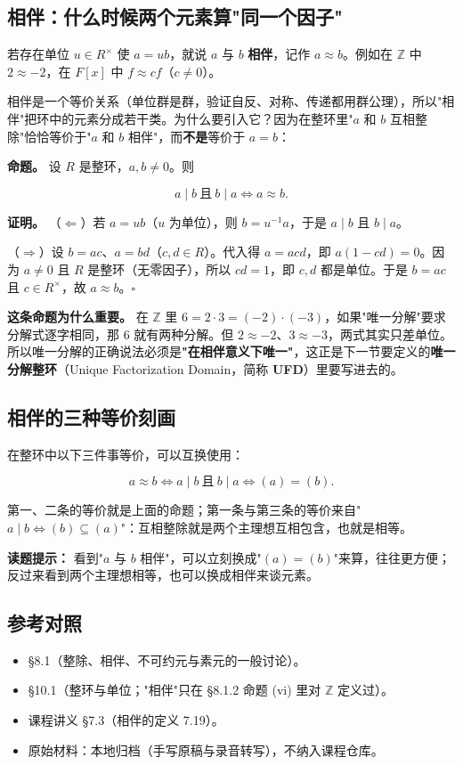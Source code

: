 \subsection{相伴：什么时候两个元素算"同一个因子"}


若存在单位 $u\in R^\times$ 使 $a=ub$，就说 $a$ 与 $b$ \textbf{相伴}，记作 $a\approx b$。例如在 $\mathbb Z$ 中 $2\approx-2$，在 $F[x]$ 中 $f\approx cf$（$c\ne0$）。

相伴是一个等价关系（单位群是群，验证自反、对称、传递都用群公理），所以"相伴"把环中的元素分成若干类。为什么要引入它？因为在整环里"$a$ 和 $b$ 互相整除"恰恰等价于"$a$ 和 $b$ 相伴"，而\textbf{不是}等价于 $a=b$：

\textbf{命题。} 设 $R$ 是整环，$a,b\ne0$。则

\[
a\mid b\ \text{且}\ b\mid a\iff a\approx b .
\]

\textbf{证明。} （$\Leftarrow$）若 $a=ub$（$u$ 为单位），则 $b=u^{-1}a$，于是 $a\mid b$ 且 $b\mid a$。

（$\Rightarrow$）设 $b=ac$、$a=bd$（$c,d\in R$）。代入得 $a=acd$，即 $a(1-cd)=0$。因为 $a\ne0$ 且 $R$ 是整环（无零因子），所以 $cd=1$，即 $c,d$ 都是单位。于是 $b=ac$ 且 $c\in R^\times$，故 $a\approx b$。$\square$

\textbf{这条命题为什么重要。} 在 $\mathbb Z$ 里 $6=2\cdot3=(-2)\cdot(-3)$，如果"唯一分解"要求分解式逐字相同，那 6 就有两种分解。但 $2\approx-2$、$3\approx-3$，两式其实只差单位。所以唯一分解的正确说法必须是\textbf{"在相伴意义下唯一"}，这正是下一节要定义的\textbf{唯一分解整环}（Unique Factorization Domain，简称 \textbf{UFD}）里要写进去的。

\subsection{相伴的三种等价刻画}


在整环中以下三件事等价，可以互换使用：

\[
a\approx b\iff a\mid b\ \text{且}\ b\mid a\iff (a)=(b).
\]

第一、二条的等价就是上面的命题；第一条与第三条的等价来自"$a\mid b\iff(b)\subseteq(a)$"：互相整除就是两个主理想互相包含，也就是相等。

\textbf{读题提示：} 看到"$a$ 与 $b$ 相伴"，可以立刻换成"$(a)=(b)$"来算，往往更方便；反过来看到两个主理想相等，也可以换成相伴来谈元素。

\subsection{参考对照}


\begin{itemize}
\item [DF] §8.1（整除、相伴、不可约元与素元的一般讨论）。
\item [DS] §10.1（整环与单位；"相伴"只在 §8.1.2 命题 (vi) 里对 $\mathbb Z$ 定义过）。
\item 课程讲义 §7.3（相伴的定义 7.19）。
\item 原始材料：本地归档（手写原稿与录音转写），不纳入课程仓库。
\end{itemize}
